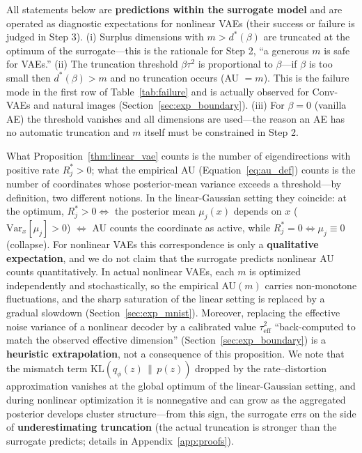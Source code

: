 \documentclass[make,article,submit,pdftex,moreauthors]{Definitions/mdpi}
\newcommand{\dstar}{d^{*}(\beta)}
\begin{document}
\begin{Remark}\label{rem:implication}
All statements below are \textbf{predictions within the surrogate model}
and are operated as diagnostic expectations for nonlinear VAEs (their
success or failure is judged in Step 3).
(i) Surplus dimensions with $m > \dstar$ are truncated at the optimum of
the surrogate---this is the rationale for Step 2, ``a generous $m$ is safe
for VAEs.''
(ii) The truncation threshold $\beta\tau^2$ is proportional to $\beta$---if
$\beta$ is too small then $\dstar > m$ and no truncation occurs
(AU $= m$).
This is the failure mode in the first row of Table~\ref{tab:failure} and is
actually observed for Conv-VAEs and natural images
(Section~\ref{sec:exp_boundary}).
(iii) For $\beta = 0$ (vanilla AE) the threshold vanishes and all
dimensions are used---the reason an AE has no automatic truncation and $m$
itself must be constrained in Step 2.
\end{Remark}

\begin{Remark}\label{rem:bridge}
What Proposition~\ref{thm:linear_vae} counts is the number of
eigendirections with positive rate $R_j^* > 0$; what the empirical AU
(Equation~\eqref{eq:au_def}) counts is the number of coordinates whose
posterior-mean variance exceeds a threshold---by definition, two different
notions.
In the linear-Gaussian setting they coincide: at the optimum,
$R_j^* > 0 \iff$ the posterior mean $\mu_j(x)$ depends on $x$
($\mathrm{Var}_x[\mu_j] > 0$) $\iff$ AU counts the coordinate as active,
while $R_j^* = 0 \iff \mu_j \equiv 0$ (collapse).
For nonlinear VAEs this correspondence is only a \textbf{qualitative
expectation}, and we do not claim that the surrogate predicts nonlinear AU
counts quantitatively.
In actual nonlinear VAEs, each $m$ is optimized independently and
stochastically, so the empirical AU$(m)$ carries non-monotone fluctuations,
and the sharp saturation of the linear setting is replaced by a gradual
slowdown (Section~\ref{sec:exp_mnist}).
Moreover, replacing the effective noise variance of a nonlinear decoder by a
calibrated value $\tau^2_{\mathrm{eff}}$ ``back-computed to match the
observed effective dimension'' (Section~\ref{sec:exp_boundary}) is a
\textbf{heuristic extrapolation}, not a consequence of this proposition.
We note that the mismatch term $\mathrm{KL}(q_\phi(z)\,\|\,p(z))$ dropped by
the rate--distortion approximation vanishes at the global optimum of the
linear-Gaussian setting, and during nonlinear optimization it is
nonnegative and can grow as the aggregated posterior develops cluster
structure---from this sign, the surrogate errs on the side of
\textbf{underestimating truncation} (the actual truncation is stronger than
the surrogate predicts; details in Appendix~\ref{app:proofs}).
\end{Remark}
\end{document}
